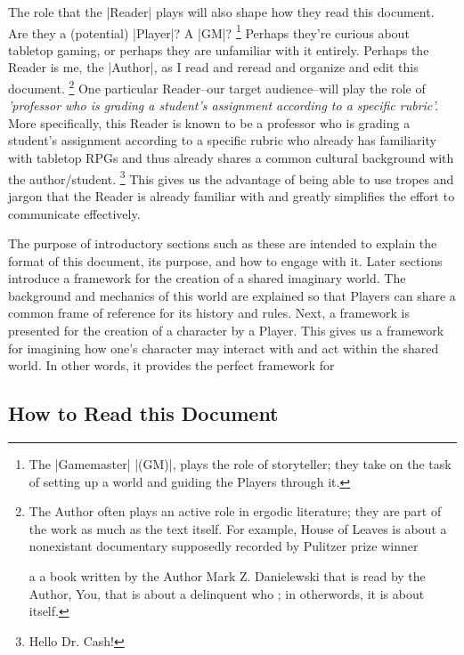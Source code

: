 \documentclass[10pt,twoside,twocolumn,openany,nomultitoc]{book}
\begin{document}
    The role that the |Reader| plays will also shape how they read this document. 
    Are they a (potential) |Player|? A |GM|?
        \footnote{The |Gamemaster|  |(GM)|, plays the role of storyteller; they take on the task of setting up a world and guiding the Players through it.} 
    Perhaps they're curious about tabletop gaming, or perhaps they are unfamiliar with it entirely. 
    Perhaps the Reader is me, the |Author|, as I read and reread and organize and edit this document.
        \footnote{The Author often plays an active role in ergodic literature; they are part of the work as much as the text itself.
        For example, \color{blue} House \color{black} of Leaves is about a nonexistant documentary supposedly recorded 
        by Pulitzer prize winner 
        
        a a book written by the Author Mark Z. Danielewski that is read by the Author, You, 
        that is about a delinquent who 
        ; in otherwords, it is about itself. }
    One particular Reader--our target audience--will play the role of \textit{'professor who is grading a student's assignment according to a specific rubric'.} 
    More specifically, this Reader is known to be a professor who is grading a student's assignment according to a specific rubric who already has familiarity 
    with tabletop RPGs and thus already shares a common cultural background with the author/student.
        \footnote{Hello Dr. Cash!} 
            This gives us the advantage of being able to use tropes and jargon that the Reader is already familiar with and greatly simplifies 
            the effort to communicate effectively.
    
    The purpose of introductory sections such as these are intended to explain the format of this document, its purpose, and how to engage with it. 
    Later sections introduce a framework for the creation of a shared imaginary world.  
    The background and mechanics of this world are explained so that Players can share a common frame of reference for its history and rules. 
    Next, a framework is presented for the creation of a character by a Player. 
    This gives us a framework for imagining how one's character may interact with and act within the shared world.
    In other words, it provides the perfect framework for \cite{dnd-gm-manual}


\subsection{How to Read this Document}
    \lipsum[2]
\end{document}

